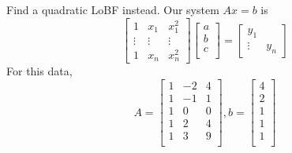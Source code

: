 \documentclass{article}
\begin{document}
\begin{example}
  Find a quadratic LoBF instead.
  Our system $Ax = b$ is \[
    \begin{bmatrix}
      1      & x_1    & x_1^2  \\
      \vdots & \vdots & \vdots \\
      1      & x_n    & x_n^2
    \end{bmatrix}
    \begin{bmatrix}
      a \\b\\c\\
    \end{bmatrix} =
    \begin{bmatrix}
      y_1 \\ \vdots & y_n
    \end{bmatrix}
  \]
  For this data, \[
    A =
    \begin{bmatrix}
      1 & -2 & 4 \\
      1 & -1 & 1 \\
      1 & 0  & 0 \\
      1 & 2  & 4 \\
      1 & 3  & 9 \\
    \end{bmatrix}, b =
    \begin{bmatrix}
      4 \\2\\1\\1\\1\\
    \end{bmatrix}
  \]


\end{example}
\end{document}
